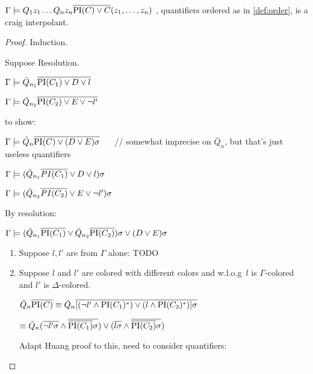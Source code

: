 \documentclass[,%
	paper=a4,%
	DIV20, 
	liststotoc,
	bibtotoc,
	draft=false,%
	numbers=noendperiod
]{scrartcl}
\begin{document}
\clearpage

\begin{prop}
	$\Gamma \entails Q_1 z_1 \ldots Q_n z_n \overline{\PI(C) \lor C}(z_1, \ldots, z_n)$ , quantifiers ordered as in \ref{def:order}, is a craig interpolant.
\end{prop}

\begin{proof}

	Induction.

	Suppose Resolution.
	\begin{prooftree}
	\end{prooftree}

	$\Gamma \entails \bar Q_{n_1} \overline{\PI(C_1)  \lor D \lor l}$

	$\Gamma \entails \bar Q_{n_2} \overline{\PI(C_2)  \lor E \lor \lnot l'}$

	to show:

	$\Gamma \entails \bar Q_n \overline {\PI(C) \lor (D \lor E)\sigma}$ $\quad$ // somewhat imprecise on $\bar Q_n$, but that's just useless quantifiers


	$\Gamma \entails ( \bar Q_{n_1} \overline{PI(C_1)}  \lor D \lor l )\sigma$

	$\Gamma \entails (\bar Q_{n_2} \overline{PI(C_2)}  \lor E \lor \lnot l')\sigma$

	By resolution:

	$\Gamma \entails (\bar Q_{n_1} \overline{\PI(C_1)}\lor \bar Q_{n_2} \overline{\PI(C_2)})\sigma  \lor (D \lor E )\sigma$


	\begin{enumerate}
		\item Suppose $l, l'$ are from $\Gamma$ alone:
			TODO


		\item Suppose $l$ and $l'$ are colored with different colors and w.l.o.g~$l$ is $\Gamma$-colored and $l'$ is $\Delta$-colored.

			$\bar Q_n \overline{\PI(C)} \equiv \bar Q_n  \overline{[ (\lnot l' \land \PI(C_1)^*) \lor (l \land \PI(C_2)^*) ] \sigma}$

			$\equiv \bar Q_n  (\overline{\lnot l'\sigma} \land \overline{\overline{\PI(C_1)}\sigma}) \lor (\overline{l\sigma} \land \overline{\overline{\PI(C_2)}\sigma})$

			Adapt Huang proof to this, need to consider quantifiers:


\end{enumerate}
\end{proof}
\end{document}
